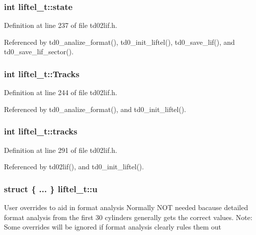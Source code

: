 \subsubsection[{\texorpdfstring{state}{state}}]{\setlength{\rightskip}{0pt plus 5cm}int liftel\+\_\+t\+::state}\hypertarget{structliftel__t_a579b9a2411fc6cf4bcdd4cac15d48e49}{}\label{structliftel__t_a579b9a2411fc6cf4bcdd4cac15d48e49}


Definition at line 237 of file td02lif.\+h.



Referenced by td0\+\_\+analize\+\_\+format(), td0\+\_\+init\+\_\+liftel(), td0\+\_\+save\+\_\+lif(), and td0\+\_\+save\+\_\+lif\+\_\+sector().

\subsubsection[{\texorpdfstring{Tracks}{Tracks}}]{\setlength{\rightskip}{0pt plus 5cm}int liftel\+\_\+t\+::\+Tracks}\hypertarget{structliftel__t_a1c433cb2546f09c4093f0e98d61212b2}{}\label{structliftel__t_a1c433cb2546f09c4093f0e98d61212b2}


Definition at line 244 of file td02lif.\+h.



Referenced by td0\+\_\+analize\+\_\+format(), and td0\+\_\+init\+\_\+liftel().

\subsubsection[{\texorpdfstring{tracks}{tracks}}]{\setlength{\rightskip}{0pt plus 5cm}int liftel\+\_\+t\+::tracks}\hypertarget{structliftel__t_a24244c0ee111d3f46eedd7578eb1acf7}{}\label{structliftel__t_a24244c0ee111d3f46eedd7578eb1acf7}


Definition at line 291 of file td02lif.\+h.



Referenced by td02lif(), and td0\+\_\+init\+\_\+liftel().

\subsubsection[{\texorpdfstring{u}{u}}]{\setlength{\rightskip}{0pt plus 5cm}struct \{ ... \}   liftel\+\_\+t\+::u}\hypertarget{structliftel__t_a039066f2594254d80396de7e4c1bf106}{}\label{structliftel__t_a039066f2594254d80396de7e4c1bf106}
User overrides to aid in format analysis Normally N\+OT needed bacause detailed format analysis from the first 30 cylinders generally gets the correct values. Note\+: Some overrides will be ignored if format analysis clearly rules them out

